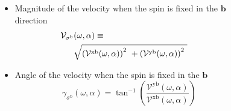 \documentclass{beamer}
\begin{document}
\begin{frame}
{\begin{columns}
\begin{figure}[h!]
\end{figure}


\begin{itemize}

\item Magnitude of the velocity when the spin is fixed in the $\mathbf{b}$
direction 
\begin{align}
\hspace{-4mm}
\mathcal{V}_{\sigma^{\mathrm{b}}}&(\omega,\alpha)
\equiv \nonumber \\ 
&\sqrt{
\left(\mathcal{V}^{\mathrm{xb}}(\omega,\alpha)\right)^{2}\ +
\left(\mathcal{V}^{\mathrm{yb}}(\omega,\alpha)\right)^{2}\ }
\label{eq:vs-mag}
\end{align}

\item 
Angle of the velocity when the spin is fixed in the $\mathbf{b}$
\begin{equation}
\gamma_{\sigma^\mathrm{b}} (\omega,\alpha)
=
\tan^{-1} \left( \frac{\mathcal{V}^{\mathrm{yb}}(\omega,\alpha)}
{\mathcal{V}^{\mathrm{xb}}(\omega,\alpha)} \right)
\label{eq:gamma-ang}
\end{equation}

\end{itemize}
    

\end{columns}

}

\end{frame}
\end{document}
